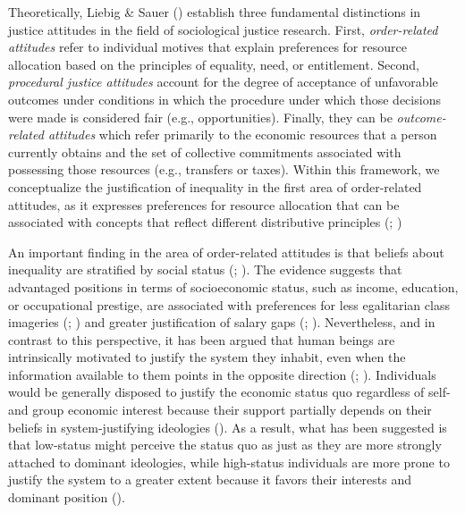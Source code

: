\documentclass[
  12pt,
  a4paper,
]{article}
\begin{document}
Theoretically, Liebig \& Sauer () establish three fundamental distinctions in justice attitudes in the field of sociological justice research. First, \emph{order-related attitudes} refer to individual motives that explain preferences for resource allocation based on the principles of equality, need, or entitlement. Second, \emph{procedural justice attitudes} account for the degree of acceptance of unfavorable outcomes under conditions in which the procedure under which those decisions were made is considered fair (e.g., opportunities). Finally, they can be \emph{outcome-related attitudes} which refer primarily to the economic resources that a person currently obtains and the set of collective commitments associated with possessing those resources (e.g., transfers or taxes). Within this framework, we conceptualize the justification of inequality in the first area of order-related attitudes, as it expresses preferences for resource allocation that can be associated with concepts that reflect different distributive principles (; )

An important finding in the area of order-related attitudes is that beliefs about inequality are stratified by social status (; ). The evidence suggests that advantaged positions in terms of socioeconomic status, such as income, education, or occupational prestige, are associated with preferences for less egalitarian class imageries (; ) and greater justification of salary gaps (; ). Nevertheless, and in contrast to this perspective, it has been argued that human beings are intrinsically motivated to justify the system they inhabit, even when the information available to them points in the opposite direction (; ). Individuals would be generally disposed to justify the economic status quo regardless of self- and group economic interest because their support partially depends on their beliefs in system-justifying ideologies (). As a result, what has been suggested is that low-status might perceive the status quo as just as they are more strongly attached to dominant ideologies, while high-status individuals are more prone to justify the system to a greater extent because it favors their interests and dominant position ().
\end{document}
